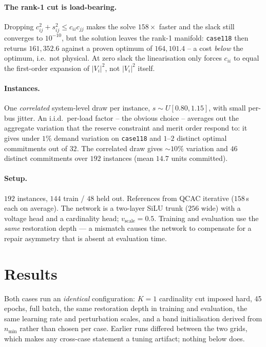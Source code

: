 \documentclass[11pt]{article}
\begin{document}
\paragraph{The rank-1 cut is load-bearing.} Dropping
$c_{ij}^2+s_{ij}^2 \le c_{ii}c_{jj}$ makes the solve $158\times$ faster and the
slack still converges to $10^{-10}$, but the solution leaves the rank-1 manifold:
\texttt{case118} then returns $161{,}352.6$ against a proven optimum of
$164{,}101.4$ -- a cost \emph{below} the optimum, i.e.\ not physical. At zero
slack the linearisation only forces $c_{ii}$ to equal the first-order expansion
of $|V_i|^2$, not $|V_i|^2$ itself.

\paragraph{Instances.} One \emph{correlated} system-level draw per instance,
$s\sim U[0.80,1.15]$, with small per-bus jitter. An i.i.d.\ per-load factor --
the obvious choice -- averages out the aggregate variation that the reserve
constraint and merit order respond to: it gives under $1\%$ demand variation on
\texttt{case118} and $1$--$2$ distinct optimal commitments out of $32$. The
correlated draw gives ${\sim}10\%$ variation and $46$ distinct commitments over
$192$ instances (mean $14.7$ units committed).

\paragraph{Setup.} $192$ instances, $144$ train / $48$ held out. References from
QCAC iterative ($158$\,s each on average). The network is a two-layer SiLU trunk
($256$ wide) with a voltage head and a cardinality head; $v_{\text{scale}}=0.5$.
Training and evaluation use the \emph{same} restoration depth --- a mismatch
causes the network to compensate for a repair asymmetry that is absent at
evaluation time.

\section{Results}

Both cases run an \emph{identical} configuration: $K{=}1$ cardinality cut
imposed hard, 45 epochs, full batch, the same restoration depth in training and
evaluation, the same learning rate and perturbation scales, and a band
initialisation derived from $n_{\min}$ rather than chosen per case. Earlier runs
differed between the two grids, which makes any cross-case statement a tuning
artifact; nothing below does.
\end{document}
